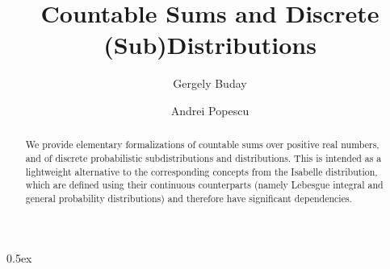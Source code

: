 \documentclass[11pt,a4paper]{article}
\begin{document}
\title{Countable Sums and Discrete (Sub)Distributions}
\author{Gergely Buday \and Andrei Popescu}
\maketitle

\begin{abstract}
	We provide elementary formalizations of countable sums over positive real numbers, and of  discrete probabilistic subdistributions and distributions. This is intended as a lightweight alternative to the corresponding concepts from the Isabelle distribution, which are defined using  their continuous counterparts (namely Lebesgue integral and general probability distributions) and therefore have significant dependencies.  
\end{abstract} 

\tableofcontents

\parindent 0pt\parskip 0.5ex



%
%
\end{document}
